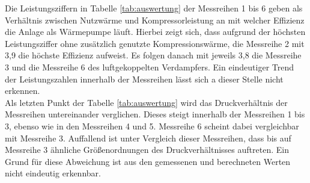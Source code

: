 Die Leistungsziffern in Tabelle \ref{tab:auswertung} der Messreihen 1 bis 6 geben als Verhältnis zwischen Nutzwärme und Kompressorleistung an mit welcher Effizienz die Anlage als Wärmepumpe läuft. Hierbei zeigt sich, dass aufgrund der höchsten Leistungsziffer ohne zusätzlich genutzte Kompressionswärme, die Messreihe 2 mit 3,9 die höchste Effizienz aufweist. Es folgen danach mit jeweils 3,8 die Messreihe 3 und die Messreihe 6 des luftgekoppelten Verdampfers. Ein eindeutiger Trend der Leistungszahlen innerhalb der Messreihen lässt sich a dieser Stelle nicht erkennen.\\

Als letzten Punkt der Tabelle \ref{tab:auswertung} wird das Druckverhältnis der Messreihen untereinander verglichen. Dieses steigt innerhalb der Messreihen 1 bis 3, ebenso wie in den Messreihen 4 und 5. Messreihe 6 scheint dabei vergleichbar mit Messreihe 3. Auffallend ist unter Vergleich dieser Messreihen, dass bis auf Messreihe 3 ähnliche Größenordnungen des Druckverhältnisses auftreten. Ein Grund für diese Abweichung ist aus den gemessenen und berechneten Werten nicht eindeutig erkennbar.
